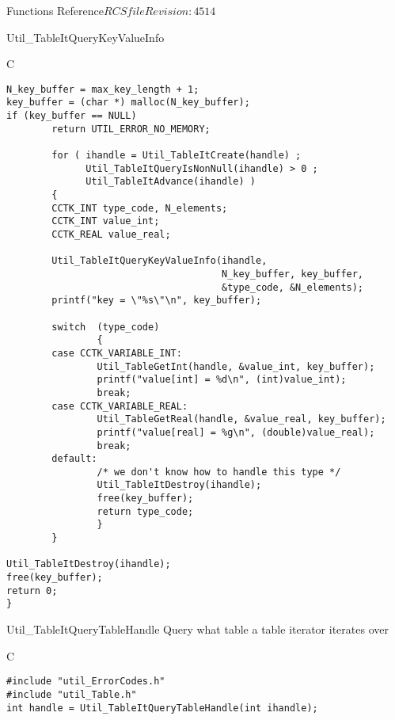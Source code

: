 \begin{cactuspart}{ Functions Reference}{$RCSfile$}{$Revision: 4514 $}
\begin{FunctionDescription}{Util\_TableItQueryKeyValueInfo}
\begin{ExampleSection}
\begin{Example}{C}
\begin{verbatim}
N_key_buffer = max_key_length + 1;
key_buffer = (char *) malloc(N_key_buffer);
if (key_buffer == NULL)
        return UTIL_ERROR_NO_MEMORY;

        for ( ihandle = Util_TableItCreate(handle) ;
              Util_TableItQueryIsNonNull(ihandle) > 0 ;
              Util_TableItAdvance(ihandle) )
        {
        CCTK_INT type_code, N_elements;
        CCTK_INT value_int;
        CCTK_REAL value_real;

        Util_TableItQueryKeyValueInfo(ihandle,
                                      N_key_buffer, key_buffer,
                                      &type_code, &N_elements);
        printf("key = \"%s\"\n", key_buffer);

        switch  (type_code)
                {
        case CCTK_VARIABLE_INT:
                Util_TableGetInt(handle, &value_int, key_buffer);
                printf("value[int] = %d\n", (int)value_int);
                break;
        case CCTK_VARIABLE_REAL:
                Util_TableGetReal(handle, &value_real, key_buffer);
                printf("value[real] = %g\n", (double)value_real);
                break;
        default:
                /* we don't know how to handle this type */
                Util_TableItDestroy(ihandle);
                free(key_buffer);
                return type_code;
                }
        }

Util_TableItDestroy(ihandle);
free(key_buffer);
return 0;
}
\end{verbatim}
\end{Example}
\end{ExampleSection}
\end{FunctionDescription}


\begin{FunctionDescription}{Util\_TableItQueryTableHandle}
\label{Util-TableItQueryTableHandle}
Query what table a table iterator iterates over

\begin{SynopsisSection}
\begin{Synopsis}{C}
\begin{verbatim}
#include "util_ErrorCodes.h"
#include "util_Table.h"
int handle = Util_TableItQueryTableHandle(int ihandle);
\end{verbatim}
\end{Synopsis}
\end{SynopsisSection}


\end{FunctionDescription}
\end{cactuspart}
